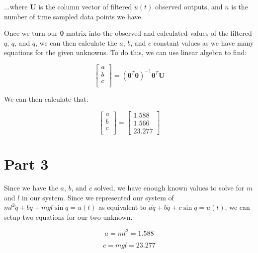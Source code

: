 \documentclass{article}
\begin{document}
...where $\boldsymbol{U}$ is the column vector of filtered $u(t)$ observed outputs, and $n$ is the number of time sampled data points we have.

Once we turn our $\boldsymbol{\theta}$ matrix into the observed and calculated values of the filtered $q$, $\dot{q}$, and $\ddot{q}$, we can then calculate the $a$, $b$, and $c$ constant values as we have many equations for the given unknowns. To do this, we can use linear algebra to find:

\begin{equation}
    \begin{bmatrix}
        a \\
        b \\
        c \\
    \end{bmatrix} = (\boldsymbol{\theta}^T \boldsymbol{\theta})^{-1} \boldsymbol{\theta}^T \boldsymbol{U}
\end{equation}

We can then calculate that:

\begin{equation}
    \begin{bmatrix}
        a \\
        b \\
        c \\
    \end{bmatrix} = \begin{bmatrix}
        1.588 \\
        1.566 \\
        23.277
    \end{bmatrix}
\end{equation}

\section*{Part 3}

Since we have the $a$, $b$, and $c$ solved, we have enough known values to solve for $m$ and $l$ in our system. Since we represented our system of $ml^2\ddot{q}+b\dot{q}+mgl\sin{q}=u(t)$ as equivalent to $a\ddot{q}+b\dot{q}+c\sin{q}=u(t)$, we can setup two equations for our two unknown.

\begin{equation}
    a = ml^2 = 1.588
\end{equation}

\begin{equation}
    c = mgl = 23.277
\end{equation}
\end{document}
